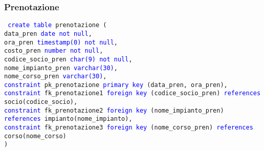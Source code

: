 \documentclass{article}
\begin{document}
    \subsubsection{Prenotazione}
    \begin{flushleft}
        \texttt{
        \textcolor{blue}{create table} prenotazione ( \\
        \hspace*{2em} data\_pren \hspace*{3.9em} \textcolor{blue}{date} \hspace*{5em} \textcolor{blue}{not null}, \\
        \hspace*{2em} ora\_pren \hspace*{4.4em} \textcolor{blue}{timestamp(0)} \hspace*{1.1em} \textcolor{blue}{not null}, \\
        \hspace*{2em} costo\_pren \hspace*{3.5em} \textcolor{blue}{number} \hspace*{4em} \textcolor{blue}{not null}, \\
        \hspace*{2em} codice\_socio\_pren \hspace*{0em} \textcolor{blue}{char(9)} \hspace*{3.7em} \textcolor{blue}{not null}, \\
        \hspace*{2em} nome\_impianto\_pren \hspace*{-0.5em} \textcolor{blue}{varchar(30)}, \\
        \hspace*{2em} nome\_corso\_pren \hspace*{1em} \textcolor{blue}{varchar(30)}, \\
        \hspace*{2em} \textcolor{blue}{constraint} pk\_prenotazione \textcolor{blue}{primary key} (data\_pren, ora\_pren), \\
        \hspace*{2em} \textcolor{blue}{constraint} fk\_prenotazione1 \textcolor{blue}{foreign key} (codice\_socio\_pren) \textcolor{blue}{references} \hspace*{2em} socio(codice\_socio), \\
        \hspace*{2em} \textcolor{blue}{constraint} fk\_prenotazione2 \textcolor{blue}{foreign key} (nome\_impianto\_pren) \textcolor{blue}{references} \hspace*{2em} impianto(nome\_impianto), \\
        \hspace*{2em} \textcolor{blue}{constraint} fk\_prenotazione3 \textcolor{blue}{foreign key} (nome\_corso\_pren) \textcolor{blue}{references} \hspace*{2em} corso(nome\_corso) \\)}
    \end{flushleft}
\end{document}
